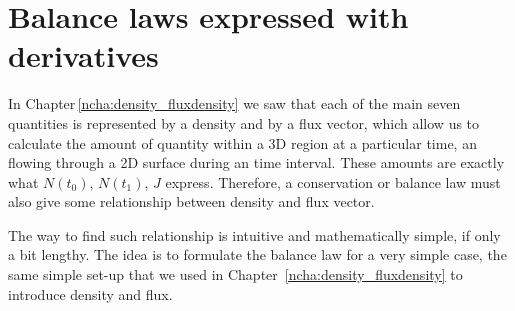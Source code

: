 \documentclass[a4paper,12pt,%
onecolumn,oneside,titlepage,%
british%
]{memoir}
\renewcommand*{\|}[1][]{\nonscript\:#1\vert\nonscript\:\mathopen{}}
\newcommand*{\chap}{Chapter}%
\newcommand*{\yti}{t_{0}}
\newcommand*{\ytf}{t_{1}}
\newcommand*{\yN}{N}
\newcommand*{\yJ}{J}
\begin{document}



\section{Balance laws expressed with derivatives}
\label{nsec:balance_derivative}

In \chap\,\ref{ncha:density_fluxdensity} we saw that each of the main seven quantities is represented by a density and by a flux vector, which allow us to calculate the amount of quantity within a 3D region at a particular time, an flowing through a 2D surface during an time interval. These amounts are exactly what $\yN(\yti)$, $\yN(\ytf)$, $\yJ$ express. Therefore, a conservation or balance law must also give some relationship between density and flux vector.

The way to find such relationship is intuitive and mathematically simple, if only a bit lengthy. The idea is to formulate the balance law for a very simple case, the same simple set-up that we used in \chap~\ref{ncha:density_fluxdensity} to introduce density and flux.
\end{document}
